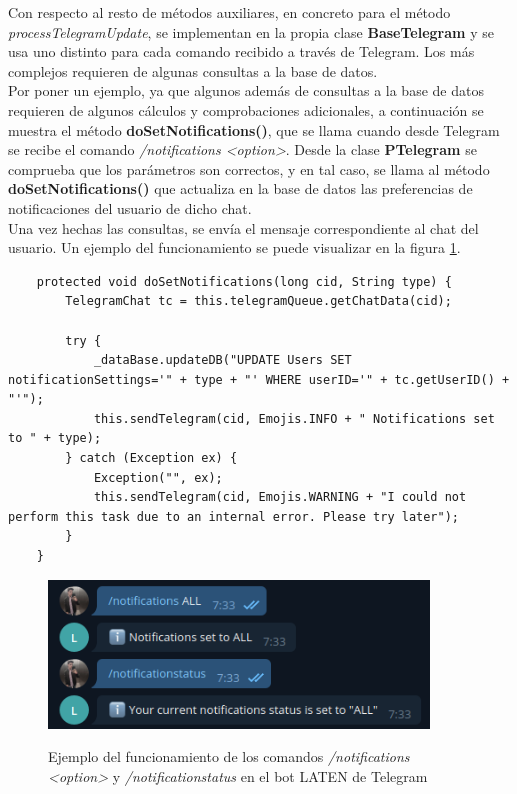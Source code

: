 Con respecto al resto de métodos auxiliares, en concreto para el método \textit{processTelegramUpdate}, se implementan en la propia clase \textbf{BaseTelegram} y se usa uno distinto para cada comando recibido a través de Telegram. Los más complejos requieren de algunas consultas a la base de datos.\\

Por poner un ejemplo, ya que algunos además de consultas a la base de datos requieren de algunos cálculos y comprobaciones adicionales, a continuación se muestra el método \textbf{doSetNotifications()}, que se llama cuando desde Telegram se recibe el comando \textit{/notifications <option>}. Desde la clase \textbf{PTelegram} se comprueba que los parámetros son correctos, y en tal caso, se llama al método \textbf{doSetNotifications()} que actualiza en la base de datos las preferencias de notificaciones del usuario de dicho chat.\\

Una vez hechas las consultas, se envía el mensaje correspondiente al chat del usuario. Un ejemplo del funcionamiento se puede visualizar en la figura \ref{img:exampletelegram}.

\begin{lstlisting}
    protected void doSetNotifications(long cid, String type) {
        TelegramChat tc = this.telegramQueue.getChatData(cid);
        
        try {
            _dataBase.updateDB("UPDATE Users SET notificationSettings='" + type + "' WHERE userID='" + tc.getUserID() + "'");
            this.sendTelegram(cid, Emojis.INFO + " Notifications set to " + type);
        } catch (Exception ex) {
            Exception("", ex);
            this.sendTelegram(cid, Emojis.WARNING + "I could not perform this task due to an internal error. Please try later");
        }
    }
\end{lstlisting}

\begin{figure}[h]
\centering
\includegraphics[width=0.9\textwidth]{logos/exampletelegram.png}\\[1.4cm]
\caption{Ejemplo del funcionamiento de los comandos \textit{/notifications <option>} y \textit{/notificationstatus} en el bot LATEN de Telegram}
\label{img:exampletelegram}
\end{figure}

